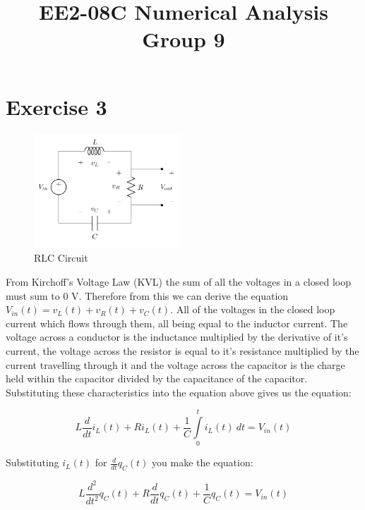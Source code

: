 \documentclass[10pt,a4paper]{article}
\date{}
\author{}
\begin{document}
\vspace{-20mm}
\title{\textbf{EE2-08C Numerical Analysis} \\ Group 9\vspace{-17mm}}
\maketitle


\section*{Exercise 3}\vspace{-1mm}

\begin{figure}
\vspace{-10mm}
  		\includegraphics[width=0.49\textwidth]{Ex3_Figs/RLC.png}
\vspace{-6mm}
  	\caption{RLC Circuit}
  	\label{fig:RLC}
\end{figure}

From Kirchoff's Voltage Law (KVL) the sum of all the voltages in a closed loop must sum to 0 V. Therefore from this we can derive the equation $V_{in}(t) = v_L(t)+v_R(t)+v_C(t)$. All of the voltages in the closed loop current which flows through them, all being equal to the inductor current. The voltage across a conductor is the inductance multiplied by the derivative of it's current, the voltage across the resistor is equal to it's resistance multiplied by the current travelling through it and the voltage across the capacitor is the charge held within the capacitor divided by the capacitance of the capacitor. Substituting these characteristics into the equation above gives us the equation:

\[ L \frac{d}{dt}i_L(t) + R i_L(t) + \frac{1}{C}\int\limits_0^t i_L(t) \ dt = V_{in}(t)\]

Substituting $i_L(t)$ for $\frac{d}{dt}q_C(t)$ you make the equation:

\[ L \frac{d^2}{dt^2}q_C(t) + R\frac{d}{dt}q_C(t) + \frac{1}{C}q_C(t) = V_{in}(t)\]
\end{document}
